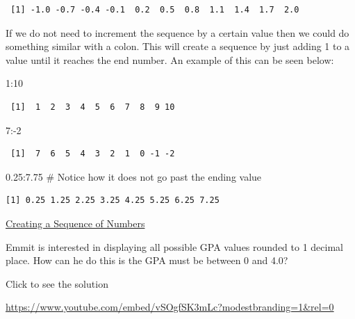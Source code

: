 \documentclass[
  letterpaper,
  DIV=11,
  numbers=noendperiod]{scrreprt}
\newenvironment{Shaded}{\begin{snugshade}}{\end{snugshade}}
\newcommand{\CommentTok}[1]{\textcolor[rgb]{0.37,0.37,0.37}{#1}}
\newcommand{\DecValTok}[1]{\textcolor[rgb]{0.68,0.00,0.00}{#1}}
\newcommand{\FloatTok}[1]{\textcolor[rgb]{0.68,0.00,0.00}{#1}}
\newcommand{\SpecialCharTok}[1]{\textcolor[rgb]{0.37,0.37,0.37}{#1}}
\begin{document}
\begin{verbatim}
 [1] -1.0 -0.7 -0.4 -0.1  0.2  0.5  0.8  1.1  1.4  1.7  2.0
\end{verbatim}

If we do not need to increment the sequence by a certain value then we
could do something similar with a colon. This will create a sequence by
just adding 1 to a value until it reaches the end number. An example of
this can be seen below:

\begin{Shaded}
\begin{Highlighting}[]
\DecValTok{1}\SpecialCharTok{:}\DecValTok{10}
\end{Highlighting}
\end{Shaded}

\begin{verbatim}
 [1]  1  2  3  4  5  6  7  8  9 10
\end{verbatim}

\begin{Shaded}
\begin{Highlighting}[]
\DecValTok{7}\SpecialCharTok{:{-}}\DecValTok{2}
\end{Highlighting}
\end{Shaded}

\begin{verbatim}
 [1]  7  6  5  4  3  2  1  0 -1 -2
\end{verbatim}

\begin{Shaded}
\begin{Highlighting}[]
\FloatTok{0.25}\SpecialCharTok{:}\FloatTok{7.75} \CommentTok{\# Notice how it does not go past the ending value}
\end{Highlighting}
\end{Shaded}

\begin{verbatim}
[1] 0.25 1.25 2.25 3.25 4.25 5.25 6.25 7.25
\end{verbatim}

\begin{watch}{}{}
    \href{https://youtu.be/c4qJ3Y5hJ0s}{Creating a Sequence of Numbers}
\end{watch}

\begin{tcolorbox}[enhanced jigsaw, colframe=quarto-callout-tip-color-frame, colback=white, breakable, rightrule=.15mm, title=\textcolor{quarto-callout-tip-color}{\faLightbulb}\hspace{0.5em}{Try it Out}, bottomtitle=1mm, toptitle=1mm, titlerule=0mm, left=2mm, coltitle=black, colbacktitle=quarto-callout-tip-color!10!white, leftrule=.75mm, opacitybacktitle=0.6, bottomrule=.15mm, opacityback=0, arc=.35mm, toprule=.15mm]

Emmit is interested in displaying all possible GPA values rounded to 1
decimal place. How can he do this is the GPA must be between 0 and 4.0?

Click to see the solution

\url{https://www.youtube.com/embed/vSOgfSK3mLc?modestbranding=1&rel=0}

\end{tcolorbox}
\end{document}
